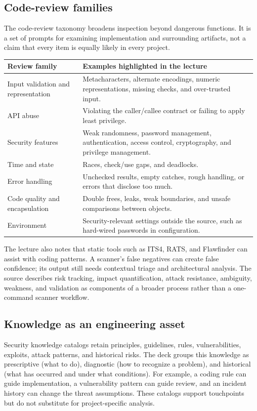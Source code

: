 \documentclass[11pt,a4paper]{article}
\numberwithin{figure}{section}
\begin{document}
\subsection{Code-review families}
The code-review taxonomy broadens inspection beyond dangerous functions. It is a set of prompts for examining implementation and surrounding artifacts, not a claim that every item is equally likely in every project.
\begin{center}\small
\begin{tabularx}{\linewidth}{@{}p{43mm}Y@{}}\toprule
Review family & Examples highlighted in the lecture\\\midrule
Input validation and representation & Metacharacters, alternate encodings, numeric representations, missing checks, and over-trusted input.\\
API abuse & Violating the caller/callee contract or failing to apply least privilege.\\
Security features & Weak randomness, password management, authentication, access control, cryptography, and privilege management.\\
Time and state & Races, check/use gaps, and deadlocks.\\
Error handling & Unchecked results, empty catches, rough handling, or errors that disclose too much.\\
Code quality and encapsulation & Double frees, leaks, weak boundaries, and unsafe comparisons between objects.\\
Environment & Security-relevant settings outside the source, such as hard-wired passwords in configuration.\\\bottomrule
\end{tabularx}\end{center}
The lecture also notes that static tools such as ITS4, RATS, and Flawfinder can assist with coding patterns. A scanner's false negatives can create false confidence; its output still needs contextual triage and architectural analysis. The source describes risk tracking, impact quantification, attack resistance, ambiguity, weakness, and validation as components of a broader process rather than a one-command scanner workflow.

\subsection{Knowledge as an engineering asset}
Security knowledge catalogs retain principles, guidelines, rules, vulnerabilities, exploits, attack patterns, and historical risks. The deck groups this knowledge as prescriptive (what to do), diagnostic (how to recognize a problem), and historical (what has occurred and under what conditions). For example, a coding rule can guide implementation, a vulnerability pattern can guide review, and an incident history can change the threat assumptions. These catalogs support touchpoints but do not substitute for project-specific analysis.
\end{document}
